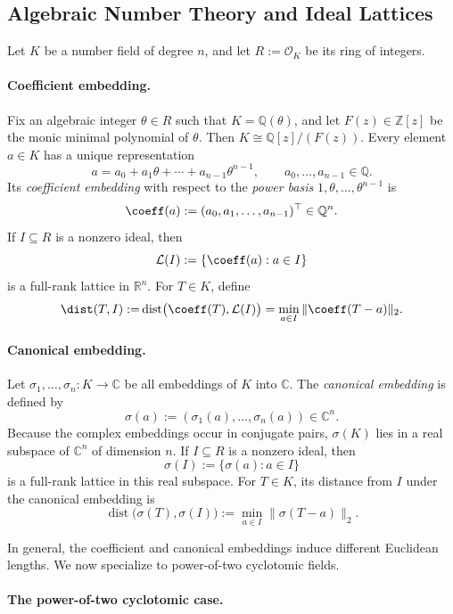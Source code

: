 \subsection{Algebraic Number Theory and Ideal Lattices}
\label{sec:simple-ideal-lattices}

Let $K$ be a number field of degree $n$, and let
$R:=\mathcal{O}_K$ be its ring of integers.

\paragraph{Coefficient embedding.}
Fix an algebraic integer $\theta\in R$ such that
$K=\mathbb{Q}(\theta)$, and let $F(z)\in\mathbb{Z}[z]$ be the monic
minimal polynomial of $\theta$.
Then $K\cong\mathbb{Q}[z]/(F(z))$.
Every element $a\in K$ has a unique representation
\[
  a=a_0+a_1\theta+\cdots+a_{n-1}\theta^{n-1},
  \qquad a_0,\ldots,a_{n-1}\in\mathbb{Q}.
\]
Its \emph{coefficient embedding} with respect to the
\emph{power basis}
$1,\theta,\ldots,\theta^{n-1}$ is
\[
  \coeff(a)
  :=(a_0,a_1,\ldots,a_{n-1})^\top\in\mathbb{Q}^n.
\]
If $I\subseteq R$ is a nonzero ideal, then
\[
  \mathcal{L}(I)
  :=\{\coeff(a):a\in I\}
\]
is a full-rank lattice in $\mathbb{R}^n$. {For $T\in K$, define}
\[
  {\dist(T,I)\mathrel{:=}}
  \operatorname{dist}\bigl(
    \coeff(T),\mathcal{L}(I)
  \bigr)
  \mathrel{{=}}
  \min_{a\in I}
  \|\coeff(T-a)\|_2.
\]

\paragraph{Canonical embedding.}
Let $\sigma_1,\ldots,\sigma_n:K\longrightarrow\mathbb{C}$ be all embeddings
of $K$ into $\mathbb{C}$. The \emph{canonical embedding} is defined by
\[
  \sigma(a)
  :=(\sigma_1(a),\ldots,\sigma_n(a))\in\mathbb{C}^n.
\]
Because the complex embeddings occur in conjugate pairs, $\sigma(K)$
lies in a real subspace of $\mathbb{C}^n$ of dimension $n$. If
$I\subseteq R$ is a nonzero ideal, then
\[
  \sigma(I):=\{\sigma(a):a\in I\}
\]
is a full-rank lattice in this real subspace. For $T\in K$, its distance
from $I$ under the canonical embedding is
\[
  \operatorname{dist}\bigl(\sigma(T),\sigma(I)\bigr)
  :=
  \min_{a\in I}\|\sigma(T-a)\|_2.
\]

In general, the coefficient and canonical embeddings induce different
Euclidean lengths. We now specialize to power-of-two
cyclotomic fields.

\paragraph{The power-of-two cyclotomic case.}
\label{sec:simple-cyclotomic}

